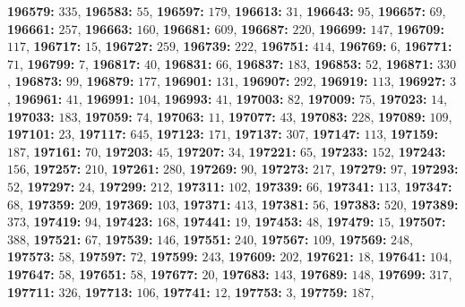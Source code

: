 \textsf{\bfseries 196579:} $335$, \textsf{\bfseries 196583:} $55$, \textsf{\bfseries 196597:} $179$, \textsf{\bfseries 196613:} $31$, \textsf{\bfseries 196643:} $95$, \textsf{\bfseries 196657:} $69$, \textsf{\bfseries 196661:} $257$, \textsf{\bfseries 196663:} $160$, \textsf{\bfseries 196681:} $609$, \textsf{\bfseries 196687:} $220$, \textsf{\bfseries 196699:} $147$, \textsf{\bfseries 196709:} $117$, \textsf{\bfseries 196717:} $15$, \textsf{\bfseries 196727:} $259$, \textsf{\bfseries 196739:} $222$, \textsf{\bfseries 196751:} $414$, \textsf{\bfseries 196769:} $6$, \textsf{\bfseries 196771:} $71$, \textsf{\bfseries 196799:} $7$, \textsf{\bfseries 196817:} $40$, \textsf{\bfseries 196831:} $66$, \textsf{\bfseries 196837:} $183$, \textsf{\bfseries 196853:} $52$, \textsf{\bfseries 196871:} $330$, \textsf{\bfseries 196873:} $99$, \textsf{\bfseries 196879:} $177$, \textsf{\bfseries 196901:} $131$, \textsf{\bfseries 196907:} $292$, \textsf{\bfseries 196919:} $113$, \textsf{\bfseries 196927:} $3$, \textsf{\bfseries 196961:} $41$, \textsf{\bfseries 196991:} $104$, \textsf{\bfseries 196993:} $41$, \textsf{\bfseries 197003:} $82$, \textsf{\bfseries 197009:} $75$, \textsf{\bfseries 197023:} $14$, \textsf{\bfseries 197033:} $183$, \textsf{\bfseries 197059:} $74$, \textsf{\bfseries 197063:} $11$, \textsf{\bfseries 197077:} $43$, \textsf{\bfseries 197083:} $228$, \textsf{\bfseries 197089:} $109$, \textsf{\bfseries 197101:} $23$, \textsf{\bfseries 197117:} $645$, \textsf{\bfseries 197123:} $171$, \textsf{\bfseries 197137:} $307$, \textsf{\bfseries 197147:} $113$, \textsf{\bfseries 197159:} $187$, \textsf{\bfseries 197161:} $70$, \textsf{\bfseries 197203:} $45$, \textsf{\bfseries 197207:} $34$, \textsf{\bfseries 197221:} $65$, \textsf{\bfseries 197233:} $152$, \textsf{\bfseries 197243:} $156$, \textsf{\bfseries 197257:} $210$, \textsf{\bfseries 197261:} $280$, \textsf{\bfseries 197269:} $90$, \textsf{\bfseries 197273:} $217$, \textsf{\bfseries 197279:} $97$, \textsf{\bfseries 197293:} $52$, \textsf{\bfseries 197297:} $24$, \textsf{\bfseries 197299:} $212$, \textsf{\bfseries 197311:} $102$, \textsf{\bfseries 197339:} $66$, \textsf{\bfseries 197341:} $113$, \textsf{\bfseries 197347:} $68$, \textsf{\bfseries 197359:} $209$, \textsf{\bfseries 197369:} $103$, \textsf{\bfseries 197371:} $413$, \textsf{\bfseries 197381:} $56$, \textsf{\bfseries 197383:} $520$, \textsf{\bfseries 197389:} $373$, \textsf{\bfseries 197419:} $94$, \textsf{\bfseries 197423:} $168$, \textsf{\bfseries 197441:} $19$, \textsf{\bfseries 197453:} $48$, \textsf{\bfseries 197479:} $15$, \textsf{\bfseries 197507:} $388$, \textsf{\bfseries 197521:} $67$, \textsf{\bfseries 197539:} $146$, \textsf{\bfseries 197551:} $240$, \textsf{\bfseries 197567:} $109$, \textsf{\bfseries 197569:} $248$, \textsf{\bfseries 197573:} $58$, \textsf{\bfseries 197597:} $72$, \textsf{\bfseries 197599:} $243$, \textsf{\bfseries 197609:} $202$, \textsf{\bfseries 197621:} $18$, \textsf{\bfseries 197641:} $104$, \textsf{\bfseries 197647:} $58$, \textsf{\bfseries 197651:} $58$, \textsf{\bfseries 197677:} $20$, \textsf{\bfseries 197683:} $143$, \textsf{\bfseries 197689:} $148$, \textsf{\bfseries 197699:} $317$, \textsf{\bfseries 197711:} $326$, \textsf{\bfseries 197713:} $106$, \textsf{\bfseries 197741:} $12$, \textsf{\bfseries 197753:} $3$, \textsf{\bfseries 197759:} $187$, 
